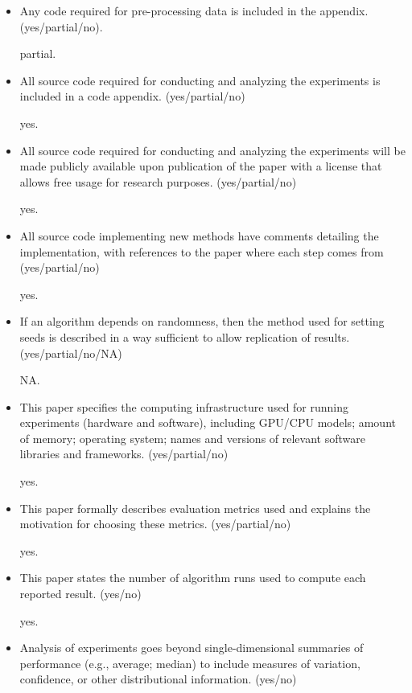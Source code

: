 \begin{itemize}
\item Any code required for pre-processing data is included in the appendix. (yes/partial/no).

partial.

\item All source code required for conducting and analyzing the experiments is included in a code appendix. (yes/partial/no)

yes.

\item All source code required for conducting and analyzing the experiments will be made publicly available upon publication of the paper with a license that allows free usage for research purposes. (yes/partial/no)

yes.

\item All source code implementing new methods have comments detailing the implementation, with references to the paper where each step comes from (yes/partial/no)

yes.

\item If an algorithm depends on randomness, then the method used for setting seeds is described in a way sufficient to allow replication of results. (yes/partial/no/NA)

NA.

\item This paper specifies the computing infrastructure used for running experiments (hardware and software), including GPU/CPU models; amount of memory; operating system; names and versions of relevant software libraries and frameworks. (yes/partial/no)

yes.

\item This paper formally describes evaluation metrics used and explains the motivation for choosing these metrics. (yes/partial/no)

yes.

\item This paper states the number of algorithm runs used to compute each reported result. (yes/no)

yes.

\item Analysis of experiments goes beyond single-dimensional summaries of performance (e.g., average; median) to include measures of variation, confidence, or other distributional information. (yes/no)


\end{itemize}

